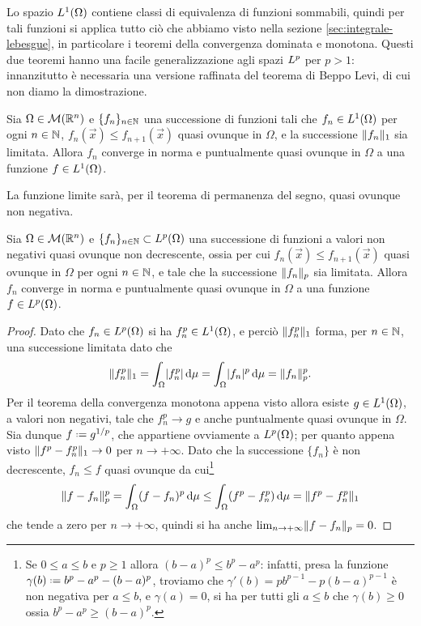 Lo spazio $\leb[1]{\Omega}$ contiene classi di equivalenza di funzioni sommabili, quindi per tali funzioni si applica tutto ciò che abbiamo visto nella sezione \ref{sec:integrale-lebesgue}, in particolare i teoremi della convergenza dominata e monotona.
Questi due teoremi hanno una facile generalizzazione agli spazi $\lclass[p]$ per $p>1$: innanzitutto è necessaria una versione raffinata del teorema di Beppo Levi, di cui non diamo la dimostrazione.
\begin{teorema} \label{t:convergenza-monotona-L1}
    Sia $\Omega\in\mis(\R^n)$ e $\{f_n\}_{n\in\N}$ una successione di funzioni tali che $f_n\in\leb[1]{\Omega}$ per ogni $n\in\N$, $f_n(\vec x)\le f_{n+1}(\vec x)$ quasi ovunque in $\Omega$, e la successione $\norm{f_n}_1$ sia limitata.
    Allora $f_n$ converge in norma e puntualmente quasi ovunque in $\Omega$ a una funzione $f\in\leb[1]{\Omega}$.
\end{teorema}
La funzione limite sarà, per il teorema di permanenza del segno, quasi ovunque non negativa.
\begin{teorema} \label{t:convergenza-monotona-Lp}
    Sia $\Omega\in\mis(\R^n)$ e $\{f_n\}_{n\in\N}\subset\leb[p]{\Omega}$ una successione di funzioni a valori non negativi quasi ovunque non decrescente, ossia per cui $f_n(\vec x)\le f_{n+1}(\vec x)$ quasi ovunque in $\Omega$ per ogni $n\in\N$, e tale che la successione $\norm{f_n}_p$ sia limitata.
    Allora $f_n$ converge in norma e puntualmente quasi ovunque in $\Omega$ a una funzione $f\in\leb[p]{\Omega}$.
\end{teorema}
\begin{proof}
    Dato che $f_n\in\leb[p]{\Omega}$ si ha $f_n^p\in\leb[1]{\Omega}$, e perciò $\norm{f_n^p}_1$ forma, per $n\in\N$, una successione limitata dato che
    \begin{equation}
        \norm{f_n^p}_1=\int_\Omega\abs{f_n^p}\,\dd\mu=\int_\Omega\abs{f_n}^p\,\dd\mu=\norm{f_n}_p^p.
    \end{equation}
    Per il teorema della convergenza monotona appena visto allora esiste $g\in\leb[1]{\Omega}$, a valori non negativi, tale che $f_n^p\to g$ e anche puntualmente quasi ovunque in $\Omega$.
    Sia dunque $f\defeq g^{1/p}$, che appartiene ovviamente a $\leb[p]{\Omega}$; per quanto appena visto $\norm{f^p-f_n^p}_1\to 0$ per $n\to +\infty$.
    Dato che la successione $\{f_n\}$ è non decrescente, $f_n\le f$ quasi ovunque da cui\footnote{
        Se $0\le a\le b$ e $p\ge 1$ allora $(b-a)^p\le b^p-a^p$: infatti, presa la funzione $\gamma(b)\defeq b^p-a^p-(b-a)^p$, troviamo che $\gamma'(b)=pb^{p-1}-p(b-a)^{p-1}$ è non negativa per $a\le b$, e $\gamma(a)=0$, si ha per tutti gli $a\le b$ che $\gamma(b)\ge 0$ ossia $b^p-a^p\ge(b-a)^p$.
    }
    \begin{equation}
        \norm{f-f_n}_p^p=
        \int_\Omega(f-f_n)^p\,\dd\mu\le
        \int_\Omega(f^p-f_n^p)\,\dd\mu=
        \norm{f^p-f_n^p}_1
    \end{equation}
    che tende a zero per $n\to+\infty$, quindi si ha anche $\lim_{n\to+\infty}\norm{f-f_n}_p=0$.
\end{proof}
